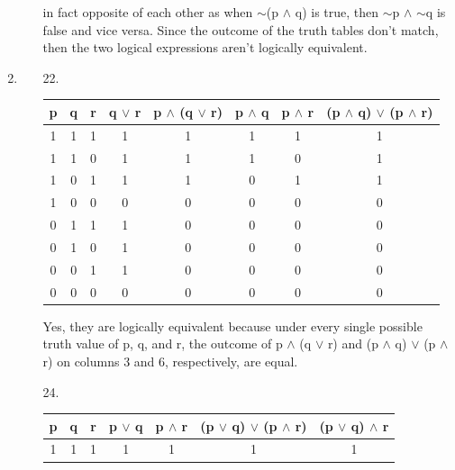 \documentclass[12pt]{article}
\begin{document}
\begin{enumerate}[label = \alph*)]
\begin{itemize}
                in fact opposite of each other as when $\sim$(p $\wedge$ q) is
                true, then $\sim$p $\wedge$ $\sim$q is false and vice versa. Since
                the outcome of the truth tables don't match, then the two logical
                expressions aren't logically equivalent.
        \end{itemize}
    \item 
        \begin{itemize}
            \item [22.]
                \begin{tabular}{ccc|c|c|c|c|c}
                    p & q & r & q $\vee$ r & p $\wedge$ (q $\vee$ r) & p $\wedge$ q
                        & p $\wedge$ r & (p $\wedge$ q) $\vee$ (p $\wedge$ r) \\
                    \hline
                    1 & 1 & 1 & 1 & 1 & 1 & 1 & 1 \\
                    1 & 1 & 0 & 1 & 1 & 1 & 0 & 1 \\
                    1 & 0 & 1 & 1 & 1 & 0 & 1 & 1 \\
                    1 & 0 & 0 & 0 & 0 & 0 & 0 & 0 \\
                    0 & 1 & 1 & 1 & 0 & 0 & 0 & 0 \\
                    0 & 1 & 0 & 1 & 0 & 0 & 0 & 0 \\
                    0 & 0 & 1 & 1 & 0 & 0 & 0 & 0 \\
                    0 & 0 & 0 & 0 & 0 & 0 & 0 & 0 \\
                \end{tabular}
            \item []
                \vspace{1em}
                Yes, they are logically equivalent because under every single
                possible truth value of p, q, and r, the outcome of 
                p $\wedge$ (q $\vee$ r) and (p $\wedge$ q) $\vee$ (p $\wedge$ r)
                on columns 3 and 6, respectively, are equal.
            \item [24.]
                \vspace{2em}
                \begin{tabular}{ccc|c|c|c|c}
                    p & q & r & p $\vee$ q & p $\wedge$ r & (p $\vee$ q) $\vee$
                        (p $\wedge$ r) & (p $\vee$ q) $\wedge$ r \\
                    \hline
                    1 & 1 & 1 & 1 & 1 & 1 & 1 \\

\end{tabular}
\end{itemize}
\end{enumerate}
\end{document}
